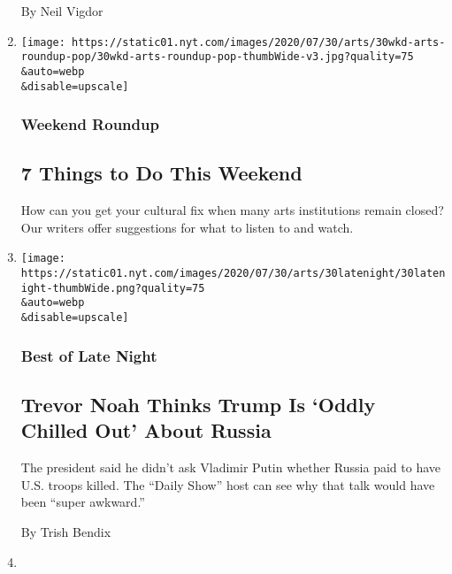 \begin{enumerate}
  By Neil Vigdor
\item
  \href{/2020/07/30/arts/things-to-do-weekend-coronavirus.html}{}

  \texttt{[image: https://static01.nyt.com/images/2020/07/30/arts/30wkd-arts-roundup-pop/30wkd-arts-roundup-pop-thumbWide-v3.jpg?quality=75\\\&auto=webp\\\&disable=upscale]}

  \hypertarget{weekend-roundup}{%
  \subsubsection{Weekend Roundup}\label{weekend-roundup}}

  \hypertarget{7-things-to-do-this-weekend}{%
  \subsection{7 Things to Do This
  Weekend}\label{7-things-to-do-this-weekend}}

  How can you get your cultural fix when many arts institutions remain
  closed? Our writers offer suggestions for what to listen to and watch.
\item
  \href{/2020/07/30/arts/television/trevor-noah-trump-russia.html}{}

  \texttt{[image: https://static01.nyt.com/images/2020/07/30/arts/30latenight/30latenight-thumbWide.png?quality=75\\\&auto=webp\\\&disable=upscale]}

  \hypertarget{best-of-late-night-1}{%
  \subsubsection{Best of Late Night}\label{best-of-late-night-1}}

  \hypertarget{trevor-noah-thinks-trump-is-oddly-chilled-out-about-russia}{%
  \subsection{Trevor Noah Thinks Trump Is `Oddly Chilled Out' About
  Russia}\label{trevor-noah-thinks-trump-is-oddly-chilled-out-about-russia}}

  The president said he didn't ask Vladimir Putin whether Russia paid to
  have U.S. troops killed. The ``Daily Show'' host can see why that talk
  would have been ``super awkward.''

  By Trish Bendix
\item
  \href{/2020/07/30/arts/television/whats-on-tv-thursday-in-my-skin-and-the-birds.html}{}


\end{enumerate}
